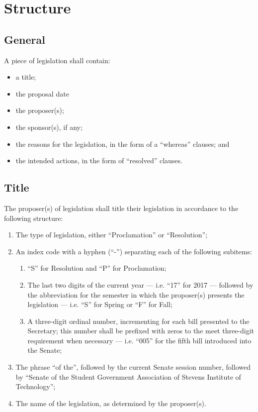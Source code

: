 \documentclass[12pt]{scrreprt}
\begin{document}
\section{Structure} \label{sec:bill_content}
\subsection{General}
A piece of legislation shall contain:
\begin{itemize}
    \item a title;
    \item the proposal date
    \item the proposer(s);
    \item the sponsor(s), if any;
    \item the reasons for the legislation, in the form of a “whereas” clauses; and
    \item the intended actions, in the form of “resolved” clauses.
\end{itemize}
    

\subsection{Title}
The proposer(s) of legislation shall title their legislation in accordance to the following
structure:
\begin{enumerate}
    \item The type of legislation, either “Proclamation” or “Resolution”;
    \item An index code with a hyphen (“-”) separating each of the following subitems:
    \begin{enumerate}
        \item “S” for Resolution and “P” for Proclamation;
        \item The last two digits of the current year — i.e. “17” for 2017 — followed by the abbreviation for the semester in which the proposer(s) presents the legislation — i.e. “S” for Spring or “F” for Fall;
        \item A three-digit ordinal number, incrementing for each bill presented to the Secretary; this number shall be prefixed with zeros to the meet three-digit requirement when necessary — i.e. “005” for the fifth bill introduced into the Senate;
    \end{enumerate}
    \item The phrase “of the”, followed by the current Senate session number, followed by “Senate of the Student Government Association of Stevens Institute of Technology”;
    \item The name of the legislation, as determined by the proposer(s).
\end{enumerate}
\end{document}
